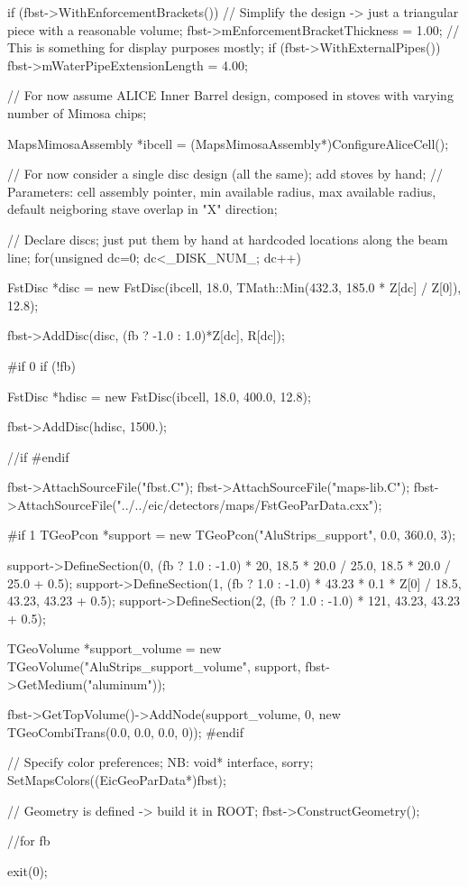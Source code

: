 \documentclass[12pt]{article}
\begin{document}
\begin{tcolorbox}
\begin{verbnobox}[\tiny]
{{    if (fbst->WithEnforcementBrackets()) // Simplify the design -> just a triangular piece with a reasonable volume; 
      fbst->mEnforcementBracketThickness   =    1.00;
    // This is something for display purposes mostly;
    if (fbst->WithExternalPipes())
      fbst->mWaterPipeExtensionLength      =    4.00;

    //  For now assume ALICE Inner Barrel design, composed in stoves with varying number of Mimosa chips;

    MapsMimosaAssembly *ibcell = (MapsMimosaAssembly*)ConfigureAliceCell();

    // For now consider a single disc design (all the same); add stoves by hand;
    // Parameters: cell assembly pointer, min available radius, max available radius, default neigboring stave overlap in "X" direction;

    // Declare discs; just put them by hand at hardcoded locations along the beam line;
    for(unsigned dc=0; dc<_DISK_NUM_; dc++) {
      FstDisc *disc = new FstDisc(ibcell, 18.0, TMath::Min(432.3, 185.0 * Z[dc] / Z[0]), 12.8);

      fbst->AddDisc(disc, (fb ? -1.0 : 1.0)*Z[dc], R[dc]);
    }
#if 0
    if (!fb) {
      FstDisc *hdisc = new FstDisc(ibcell, 18.0, 400.0, 12.8);

      fbst->AddDisc(hdisc, 1500.);
    } //if
#endif

    fbst->AttachSourceFile("fbst.C");
    fbst->AttachSourceFile("maps-lib.C");
    fbst->AttachSourceFile("../../eic/detectors/maps/FstGeoParData.cxx");

#if 1
    TGeoPcon *support = new TGeoPcon("AluStrips_support", 0.0, 360.0, 3);

    support->DefineSection(0, (fb ? 1.0 : -1.0) * 20, 18.5 * 20.0 / 25.0, 18.5 * 20.0 / 25.0 + 0.5);
    support->DefineSection(1, (fb ? 1.0 : -1.0) * 43.23 * 0.1 * Z[0] / 18.5, 43.23, 43.23 + 0.5);
    support->DefineSection(2, (fb ? 1.0 : -1.0) * 121, 43.23, 43.23 + 0.5);

    TGeoVolume *support_volume = new TGeoVolume("AluStrips_support_volume", support, fbst->GetMedium("aluminum"));

    fbst->GetTopVolume()->AddNode(support_volume, 0, new TGeoCombiTrans(0.0, 0.0, 0.0, 0));
#endif

    // Specify color preferences; NB: void* interface, sorry;
    SetMapsColors((EicGeoParData*)fbst);

    // Geometry is defined -> build it in ROOT;
    fbst->ConstructGeometry();
  } //for fb
  
  exit(0);
}
\end{verbnobox}  
\end{tcolorbox}
\end{document}
